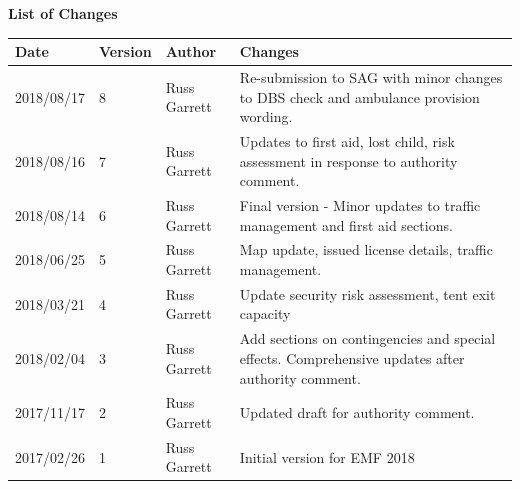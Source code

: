 \begin{titlepage}
\begin{center}
    \textbf{List of Changes}
    \begin{tabular}{l | l | l | p{10cm}}
      Date & Version & Author & Changes \\
      \hline
      2018/08/17 & 8 & Russ Garrett & Re-submission to SAG with minor changes to DBS check and ambulance provision wording. \\
      2018/08/16 & 7 & Russ Garrett & Updates to first aid, lost child, risk assessment in response to authority comment. \\
      2018/08/14 & 6 & Russ Garrett & Final version - Minor updates to traffic management and first aid sections. \\
      2018/06/25 & 5 & Russ Garrett & Map update, issued license details, traffic management. \\
      2018/03/21 & 4 & Russ Garrett & Update security risk assessment, tent exit capacity \\
      2018/02/04 & 3 & Russ Garrett & Add sections on contingencies and special effects.
                                      Comprehensive updates after authority comment. \\
      2017/11/17 & 2 & Russ Garrett & Updated draft for authority comment. \\
      2017/02/26 & 1 & Russ Garrett & Initial version for EMF 2018 \\
    \end{tabular}
\end{center}
\end{titlepage}
\setcounter{page}{2}

\tableofcontents

\newpage




